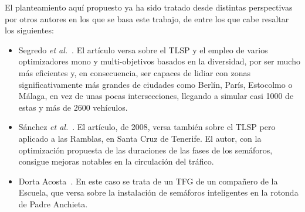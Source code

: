 El planteamiento aquí propuesto ya ha sido tratado desde distintas perspectivas por otros autores en los que se basa este trabajo, de entre los que cabe resaltar los siguientes:

\begin{itemize}
    \item Segredo \textit{et al.}~\cite{segredo_optimising_2019}. El artículo versa sobre el TLSP y el empleo de varios optimizadores mono y multi-objetivos basados en la diversidad, por ser mucho más eficientes y, en consecuencia, ser capaces de lidiar con zonas significativamente más grandes de ciudades como Berlín, París, Estocolmo o Málaga, en vez de unas pocas intersecciones, llegando a simular casi 1000 de estas y más de 2600 vehículos.
    \item Sánchez \textit{et al.}~\cite{sanchez_applying_2008}. El artículo, de 2008, versa también sobre el TLSP pero aplicado a las Ramblas, en Santa Cruz de Tenerife. El autor, con la optimización propuesta de las duraciones de las fases de los semáforos, consigue mejoras notables en la circulación del tráfico.
    \item Dorta Acosta~\cite{dorta_acosta_simulacion_2019}. En este caso se trata de un TFG de un compañero de la Escuela, que versa sobre la instalación de semáforos inteligentes en la rotonda de Padre Anchieta.
\end{itemize}

